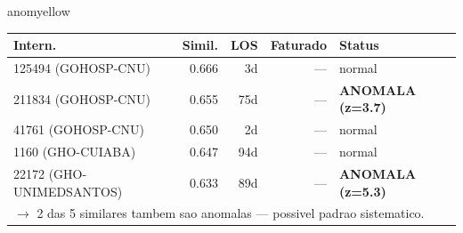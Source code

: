 \documentclass[a4paper,10pt]{article}
\begin{document}
\begin{anomalycard}[Internacao 166323 | GHO-PETROBRAS | MODERADO (z=2.38)]{anomyellow}
\begin{tabular}{l r r r l}\toprule\textbf{Intern.} & \textbf{Simil.} & \textbf{LOS} & \textbf{Faturado} & \textbf{Status} \\\midrule
125494 (GOHOSP-CNU) & 0.666 & 3d & --- & \textcolor{jcubeblue}{normal} \\
211834 (GOHOSP-CNU) & 0.655 & 75d & --- & \textcolor{anomred}{\textbf{ANOMALA (z=3.7)}} \\
41761 (GOHOSP-CNU) & 0.650 & 2d & --- & \textcolor{jcubeblue}{normal} \\
1160 (GHO-CUIABA) & 0.647 & 94d & --- & \textcolor{jcubeblue}{normal} \\
22172 (GHO-UNIMEDSANTOS) & 0.633 & 89d & --- & \textcolor{anomred}{\textbf{ANOMALA (z=5.3)}} \\
\multicolumn{5}{l}{\textcolor{anomred}{\small $\rightarrow$ 2 das 5 similares tambem sao anomalas --- possivel padrao sistematico.}} \\
\bottomrule\end{tabular}


\end{anomalycard}

\newpage
\end{document}
